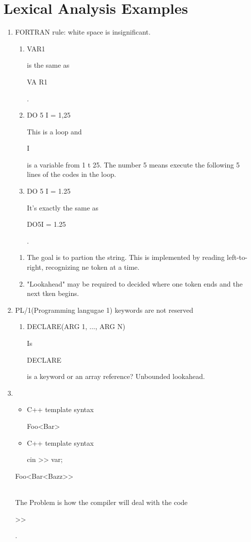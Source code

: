 \documentclass[11pt]{report}
\newenvironment{cell}{%
	\tcolorbox[blanker,breakable,left=5mm,
	before skip=10pt,after skip=10pt,
	borderline west={1mm}{0pt}{stanfordred}]
}%
{\endtcolorbox}
\newcommand{\codecell}[1] {\colorbox{codecell}{\parbox{\widthof{#1}}{#1}}}
\begin{document}
    \section{Lexical Analysis Examples}
    \begin{enumerate}
        \item \textcolor{stanfordred}{FORTRAN rule: white space is insignificant.}
        \begin{enumerate}
            \item \codecell{VAR1} is the same as \codecell{VA R1}.
            \item \codecell{DO 5 I = 1,25}
            
            This is a loop and \codecell{I} is a variable from 1 t 25. The number 5 means execute the following 5 lines of the codes in the loop.

            \item \codecell{DO 5 I = 1.25}
            
            It's exactly the same as \codecell{DO5I = 1.25}.
        \end{enumerate}
        \begin{cell}
            \begin{enumerate}
                \item The goal is to partion the string. This is implemented by reading left-to-right, recognizing ne token at a time.
                \item "Lookahead" may be required to decided where one token ends and the next tken begins. 
            \end{enumerate}
        \end{cell}
        \item \textcolor{stanfordred}{PL/1(Programming langugae 1) keywords are not reserved }
        \begin{enumerate}
            \item \codecell{DECLARE(ARG 1, ..., ARG N)}
            
            Is \codecell{DECLARE} is a keyword or an array reference? Unbounded lookahead.
        \end{enumerate}

        \item \begin{itemize}
            \item C++ template syntax \\
                \codecell{Foo<Bar>}

            \item C++ template syntax \\
                \codecell{cin >{}> var;}
        \end{itemize}
        \codecell{Foo<Bar<Bazz>{}>} \\ 
        The Problem is how the compiler will deal with the code \codecell{>{}>}.
    \end{enumerate}
    
\end{document}
